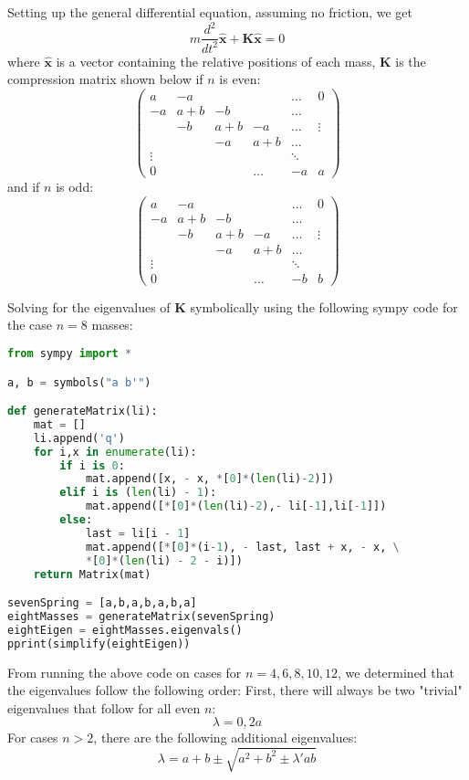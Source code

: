 \documentclass[11pt]{article}
\begin{document}
Setting up the general differential equation, assuming no friction, we get
\[
m\frac{d^2}{dt^2} \mathbf{\hat{x}} + \mathbf{K \hat{x}} = 0
\]
where $\mathbf{\hat{x}}$ is a vector containing the relative positions of each mass, $\mathbf{K}$ is the compression matrix shown below if $n$ is even:
\[
\begin{pmatrix}
a & -a &  &  & \dots & 0\\
-a & a+b & -b &  & \dots & \\
 & -b & a+b & -a & \dots & \vdots \\
 &  & -a & a + b & \dots & \\
\vdots &  &  &  & \ddots & \\
0 &  &  & \dots & -a & a
\end{pmatrix}
\]
and if $n$ is odd:
\[
\begin{pmatrix}
a & -a &  &  & \dots & 0\\
-a & a+b & -b &  & \dots & \\
 & -b & a+b & -a & \dots & \vdots \\
 &  & -a & a + b & \dots & \\
\vdots &  &  &  & \ddots & \\
0 &  &  & \dots & -b & b
\end{pmatrix}
\]

Solving for the eigenvalues of $\mathbf{K}$ symbolically using the following sympy code for the case $n=8$ masses:


\begin{lstlisting}[language=Python]
from sympy import *

a, b = symbols("a b'")

def generateMatrix(li):
    mat = []
    li.append('q')
    for i,x in enumerate(li):
        if i is 0:
            mat.append([x, - x, *[0]*(len(li)-2)])
        elif i is (len(li) - 1):
            mat.append([*[0]*(len(li)-2),- li[-1],li[-1]])
        else:
            last = li[i - 1]
            mat.append([*[0]*(i-1), - last, last + x, - x, \
            *[0]*(len(li) - 2 - i)])
    return Matrix(mat)

sevenSpring = [a,b,a,b,a,b,a]
eightMasses = generateMatrix(sevenSpring)
eightEigen = eightMasses.eigenvals()
pprint(simplify(eightEigen))
\end{lstlisting}

From running the above code on cases for $n=4,6,8,10,12$, we determined that the eigenvalues follow the following order: First, there will always be two "trivial" eigenvalues that follow for all even $n$:
\[
\lambda = 0,  2a
\]
For cases $n>2$, there are the following additional eigenvalues:
\[
\lambda = a + b \pm \sqrt{a^2 + b^2 \pm \lambda' a b}
\]
\end{document}
